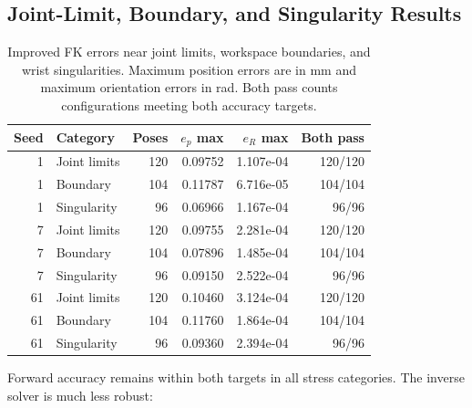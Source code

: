 \documentclass[11pt,letterpaper]{article}
\begin{document}
\subsection{Joint-Limit, Boundary, and Singularity Results}
\begin{table}[!htbp]\centering\small
\caption{Improved FK errors near joint limits, workspace boundaries, and wrist singularities. Maximum position errors are in mm and maximum orientation errors in rad. Both pass counts configurations meeting both accuracy targets.}\label{tab:stress_fk}
\begin{tabular}{@{}rlrrrr@{}}\toprule
Seed & Category & Poses & $e_p$ max & $e_R$ max & Both pass\\\midrule
1 & Joint limits & 120 & 0.09752 & 1.107e-04 & 120/120\\
1 & Boundary & 104 & 0.11787 & 6.716e-05 & 104/104\\
1 & Singularity & 96 & 0.06966 & 1.167e-04 & 96/96\\
7 & Joint limits & 120 & 0.09755 & 2.281e-04 & 120/120\\
7 & Boundary & 104 & 0.07896 & 1.485e-04 & 104/104\\
7 & Singularity & 96 & 0.09150 & 2.522e-04 & 96/96\\
61 & Joint limits & 120 & 0.10460 & 3.124e-04 & 120/120\\
61 & Boundary & 104 & 0.11760 & 1.864e-04 & 104/104\\
61 & Singularity & 96 & 0.09360 & 2.394e-04 & 96/96\\
\bottomrule\end{tabular}
\end{table}
Forward accuracy remains within both targets in all stress categories. The inverse solver is much less robust:
\end{document}
